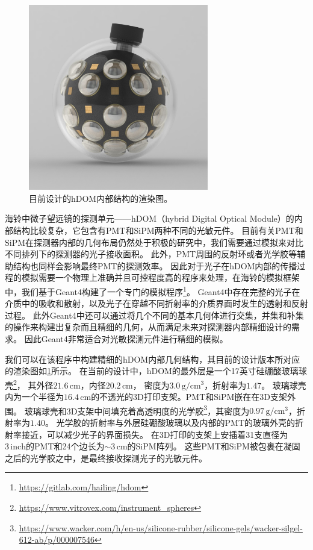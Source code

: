 \begin{figure}[htb]
\centering
    \includegraphics[width=0.7\textwidth]{img/hDOM_rendering.jpg}
    \caption{目前设计的hDOM内部结构的渲染图。}
    \label{fig:hDOM_rendering}
\end{figure}


海铃中微子望远镜的探测单元——hDOM（hybrid Digital Optical Module）的内部结构比较复杂，它包含有PMT和SiPM两种不同的光敏元件。
目前有关PMT和SiPM在探测器内部的几何布局仍然处于积极的研究中，我们需要通过模拟来对比不同排列下的探测器的光子接收面积。
此外，PMT周围的反射环或者光学胶等辅助结构也同样会影响最终PMT的探测效率\cite{IceCube-Gen2_gel_pad:2021}。
因此对于光子在hDOM内部的传播过程的模拟需要一个物理上准确并且可控程度高的程序来处理，在海铃的模拟框架中，我们基于Geant4构建了一个专门的模拟程序\footnote{\url{https://gitlab.com/hailing/hdom}}。
Geant4中存在完整的光子在介质中的吸收和散射，以及光子在穿越不同折射率的介质界面时发生的透射和反射过程。
此外Geant4中还可以通过将几个不同的基本几何体进行交集，并集和补集的操作来构建出复杂而且精细的几何，从而满足未来对探测器内部精细设计的需求。
因此Geant4非常适合对光敏探测元件进行精细的模拟。

我们可以在该程序中构建精细的hDOM内部几何结构，其目前的设计版本所对应的渲染图如\ref{fig:hDOM_rendering}所示。
在当前的设计中，hDOM的最外层是一个17英寸硅硼酸玻璃球壳\footnote{\url{https://www.vitrovex.com/instrument_spheres}}，
其外径$21.6\,\mathrm{cm}$，内径$20.2\,\mathrm{cm}$，
密度为$3.0\,\mathrm{g/cm^3}$，折射率为$1.47$。
玻璃球壳内为一个半径为$16.4\,\mathrm{cm}$的不透光的3D打印支架。PMT和SiPM嵌在在3D支架外围。
玻璃球壳和3D支架中间填充着高透明度的光学胶\footnote{\url{https://www.wacker.com/h/en-us/silicone-rubber/silicone-gels/wacker-silgel-612-ab/p/000007546}}，其密度为$0.97\,\mathrm{g/cm^3}$，折射率为$1.40$。
光学胶的折射率与外层硅硼酸玻璃以及内部的PMT的玻璃外壳的折射率接近，可以减少光子的界面损失。
在3D打印的支架上安插着31支直径为$3\,\mathrm{inch}$的PMT和24个边长为$\sim 3\,\mathrm{cm}$的SiPM阵列。
这些PMT和SiPM被包裹在凝固之后的光学胶之中，是最终接收探测光子的光敏元件。

